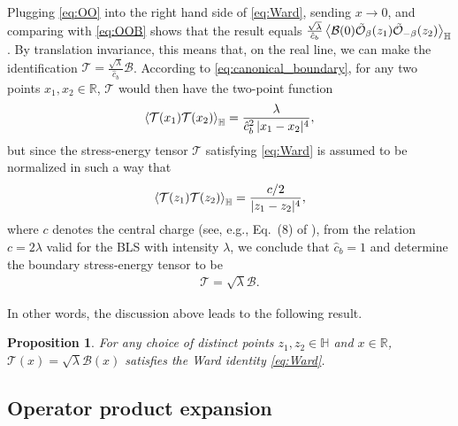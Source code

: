 \documentclass[a4paper,11pt]{article}
\newtheorem{proposition}{Proposition}[section]
\begin{document}
Plugging \eqref{eq:OO} into the right hand side of \eqref{eq:Ward}, sending $x \to 0$, and comparing with \eqref{eq:OOB} shows that the result equals $\frac{\sqrt{\lambda}}{\hat{c}_b}\Braket{ \mathcal{B}(0) \tilde{\mathcal{O}}_{\beta}(z_1) \tilde{\mathcal{O}}_{-\beta}(z_2) }_{\mathbb{H}}$. By translation invariance, this means that, on the real line, we can make the identification $\mathcal{T} = \frac{\sqrt{\lambda}}{\hat{c}_b}\mathcal{B}$.
According to \eqref{eq:canonical_boundary}, for any two points $x_1,x_2 \in \mathbb{R}$, $\mathcal{T}$ would then have the two-point function
\begin{align}
    \Braket{{\mathcal T}(x_1){\mathcal T}(x_2)}_{\mathbb H} = \frac{\lambda}{\hat{c}_b^2 \, |x_1-x_2|^{4}},
\end{align}
but since the stress-energy tensor $\mathcal{T}$ satisfying \eqref{eq:Ward} is assumed to be normalized in such a way that
\begin{align}
    \Braket{{\mathcal T}(z_1){\mathcal T}(z_2)}_{\mathbb H} = \frac{c/2}{|z_1-z_2|^{4}},
\end{align}
where $c$ denotes the central charge (see, e.g., Eq.\ (8) of \cite{CARDY2006333}), from the relation $c=2\lambda$ valid for the BLS with intensity $\lambda$, we conclude that $\hat{c}_b=1$ and determine the boundary stress-energy tensor to be
\begin{align}
    \mathcal{T} = \sqrt{\lambda}\mathcal{B}.
\end{align}

In other words, the discussion above leads to the following result.
\begin{proposition} \label{th:Ward}
For any choice of distinct points $z_1, z_2 \in \mathbb{H}$ and $x \in \mathbb{R}$, $\mathcal{T}(x) = \sqrt{\lambda}\mathcal{B}(x)$ satisfies the Ward identity \eqref{eq:Ward}.
\end{proposition}


\subsection{Operator product expansion} \label{sec:boundary-stress-energy-tensor-OPE}
\end{document}
